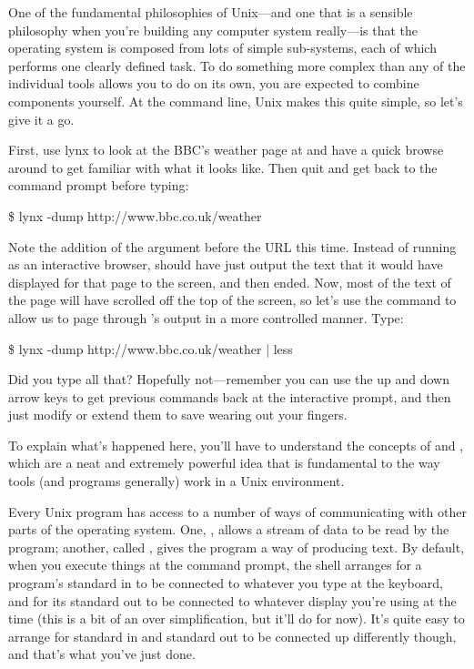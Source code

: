 One of the fundamental philosophies of Unix---and one that is a sensible philosophy when you're building any computer system really---is that the operating system is composed from lots of simple sub-systems, each of which performs one clearly defined task. To do something more complex than any of the individual tools allows you to do on its own, you are expected to combine components yourself. At the command line, Unix makes this quite simple, so let's give it a go.

First, use lynx to look at the BBC's weather page at  and have a quick browse around to get familiar with what it looks like. Then quit  and get back to the command prompt before typing:

\begin{ttoutenv}
\$ lynx -dump http://www.bbc.co.uk/weather
\end{ttoutenv}

Note the addition of the  argument before the URL this time. Instead of running as an interactive browser,  should have just output the text that it would have displayed for that page to the screen, and then ended. Now, most of the text of the page will have scrolled off the top of the screen, so let's use the  command to allow us to page through 's output in a more controlled manner. Type:

\begin{ttoutenv}
\$ lynx -dump http://www.bbc.co.uk/weather | less
\end{ttoutenv}

Did you type all that? Hopefully not---remember you can use the up and down arrow keys to get previous commands back at the interactive prompt, and then just modify or extend them to save wearing out your fingers.

To explain what's happened here, you'll have to understand the concepts of  and , which are a neat and extremely powerful idea that is fundamental to the way tools (and programs generally) work in a Unix environment.

Every Unix program has access to a number of ways of communicating with other parts of the operating system. One, , allows a stream of data to be read by the program; another, called , gives the program a way of producing text. By default, when you execute things at the command prompt, the shell arranges for a program's standard in to be connected to whatever you type at the keyboard, and for its standard out to be connected to whatever display you're using at the time (this is a bit of an over simplification, but it'll do for now). It's quite easy to arrange for standard in and standard out to be connected up differently though, and that's what you've just done.

